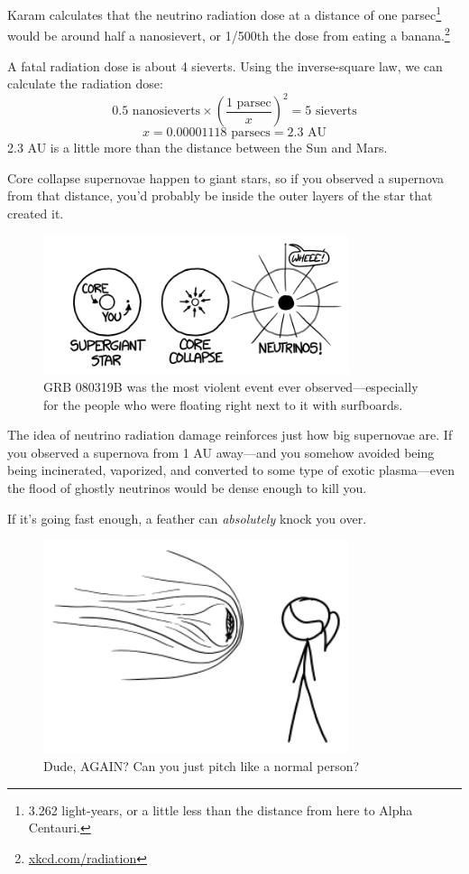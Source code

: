 {{Karam calculates that the neutrino radiation dose at a distance of one parsec{\footnote{3.262 light-years, or a little less than the distance from here to Alpha Centauri.} } would be around half a nanosievert, or 1/500th the dose from eating a banana.{\footnote{ \href{http://xkcd.com/radiation/}{xkcd.com/radiation}} } }

{A fatal radiation dose is about 4 sieverts. Using the inverse-square law, we can calculate the radiation dose:\[ 0.5\text{ nanosieverts}\times\left (\frac{1\text{ parsec}}{x}\right)^2 = 5\text{ sieverts}\]\[ x=0.00001118\text{ parsecs}=2.3\text{ AU}\] 2.3 AU is a little more than the distance between the Sun and Mars.}

{Core collapse supernovae happen to giant stars, so if you observed a supernova from that distance, you'd probably be inside the outer layers of the star that created it.}

\begin{figure}[!htbp]
\centering
\includegraphics[scale=0.5, max width=0.8\textwidth]{imgs/a/73/neutrinos_geometry.png}
\caption{GRB 080319B was the most violent event ever observed—especially for the people who were floating right next to it with surfboards.}
\end{figure}

{The idea of neutrino radiation damage reinforces just how big supernovae are. If you observed a supernova from 1 AU away—and you somehow avoided being being incinerated, vaporized, and converted to some type of exotic plasma—even the flood of ghostly neutrinos would be dense enough to kill you.}

{If it's going fast enough, a feather can \emph{absolutely} knock you over.}

\begin{figure}[!htbp]
\centering
\includegraphics[scale=0.5, max width=0.8\textwidth]{imgs/a/73/neutrinos_feather.png}
\caption{Dude, AGAIN? Can you just pitch like a normal person?}
\end{figure}

}
